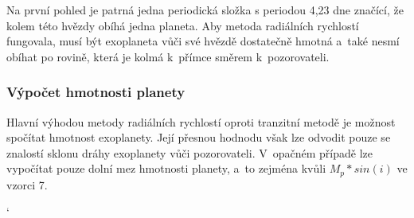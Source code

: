 \documentclass[a4paper,12pt]{article}
\begin{document}
{{Na první pohled je patrná jedna periodická složka s periodou 4,23 dne značící, že kolem této hvězdy obíhá jedna planeta. Aby metoda radiálních rychlostí fungovala, musí být exoplaneta vůči své hvězdě dostatečně hmotná a~také nesmí obíhat po rovině, která je kolmá k~přímce směrem k~pozorovateli.

\vspace{-10pt}

\subsubsection{Výpočet hmotnosti planety}

Hlavní výhodou metody radiálních rychlostí oproti tranzitní metodě je možnost spočítat hmotnost exoplanety. Její přesnou hodnodu však lze odvodit pouze se znalostí sklonu dráhy exoplanety vůči pozorovateli. V~opačném případě lze vypočítat pouze dolní mez hmotnosti planety, a~to zejména kvůli $M_p * sin(i)$ ve vzorci 7.~\cite{methods}


\clearpage

{ 
\catcode`
}}}
\end{document}
